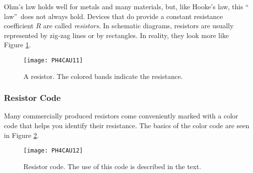 
Ohm's law holds well for metals and
many materials, but, like Hooke's law, this \textquotedblleft
law\textquotedblright\ does not always hold. Devices that do provide a
constant resistance coefficient $R$ are called \emph{resistors}. In schematic
diagrams, resistors are usually represented by zig-zag lines or by rectangles.
In reality, they look more like Figure \ref{fig:resistor}.
\begin{figure}[htbp!]
\centering
\texttt{[image: PH4CAU11]}
\caption[A resistor]{A resistor. The colored bands indicate the resistance.}
\label{fig:resistor}
\end{figure}

\subsubsection{Resistor Code}

Many commercially produced resistors come conveniently marked with a color
code that helps you identify their resistance. The basics of the color code
are seen in Figure \ref{fig:resistor_code}.
\begin{figure}[htbp!]
\centering
\texttt{[image: PH4CAU12]}
\caption[Resistor code]{Resistor code. The use of this code is
described in the text.}
\label{fig:resistor_code}
\end{figure}

